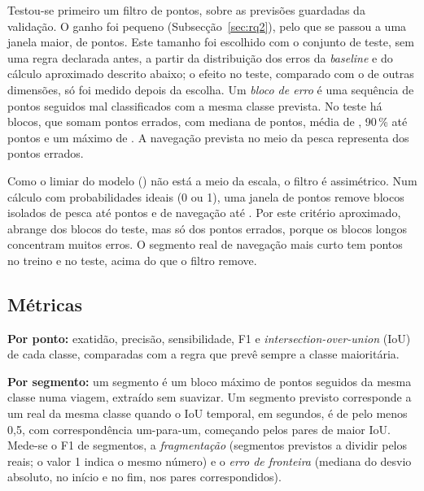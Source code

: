 \documentclass{article}
\begin{document}
Testou-se primeiro um filtro de \resPpViJanela{} pontos, sobre as previsões guardadas da validação. O ganho foi pequeno (Subsecção~\ref{sec:rq2}), pelo que se passou a uma janela maior, de \resPpJanela{} pontos. Este tamanho foi escolhido com o conjunto de teste, sem uma regra declarada antes, a partir da distribuição dos erros da \emph{baseline} e do cálculo aproximado descrito abaixo; o efeito no teste, comparado com o de outras dimensões, só foi medido depois da escolha. Um \emph{bloco de erro} é uma sequência de pontos seguidos mal classificados com a mesma classe prevista. No teste há \resBuTesteBlocos{} blocos, que somam \resBuTesteErros{} pontos errados, com mediana de \resBuTesteMediana{} pontos, média de \resBuTesteMedia{}, 90\,\% até \resBuTesteNoventa{} pontos e um máximo de \resBuTesteMaximo{}. A navegação prevista no meio da pesca representa \resBuTesteNavPercPontos{} dos pontos errados.

Como o limiar do modelo (\resSelLimiar{}) não está a meio da escala, o filtro é assimétrico. Num cálculo com probabilidades ideais (0 ou 1), uma janela de \resPpJanela{} pontos remove blocos isolados de pesca até \resBuRemovePesca{} pontos e de navegação até \resBuRemoveNav{}. Por este critério aproximado, abrange \resBuTesteBlocosCobertos{} dos blocos do teste, mas só \resBuTestePontosCobertos{} dos pontos errados, porque os blocos longos concentram muitos erros. O segmento real de navegação mais curto tem \resBuTreinoRealNavMin{} pontos no treino e \resBuTesteRealNavMin{} no teste, acima do que o filtro remove.

\subsection{Métricas}
\label{sec:metricas}

\textbf{Por ponto:} exatidão, precisão, sensibilidade, F1 e \emph{intersection-over-union} (IoU) de cada classe, comparadas com a regra que prevê sempre a classe maioritária.

\textbf{Por segmento:} um segmento é um bloco máximo de pontos seguidos da mesma classe numa viagem, extraído sem suavizar. Um segmento previsto corresponde a um real da mesma classe quando o IoU temporal, em segundos, é de pelo menos 0,5, com correspondência um-para-um, começando pelos pares de maior IoU. Mede-se o F1 de segmentos, a \emph{fragmentação} (segmentos previstos a dividir pelos reais; o valor 1 indica o mesmo número) e o \emph{erro de fronteira} (mediana do desvio absoluto, no início e no fim, nos pares correspondidos).
\end{document}
